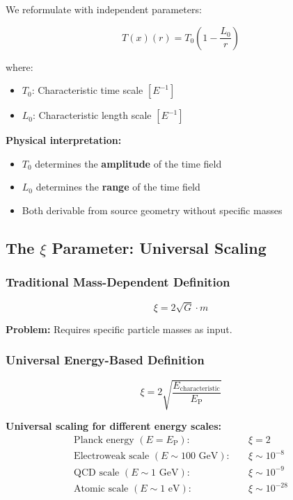 \documentclass[12pt,a4paper]{article}
\newcommand{\Tfield}{T(x)}
\newcommand{\Tzero}{T_0}
\newcommand{\EP}{E_{\text{P}}}
\newcommand{\xipar}{\xi}
\begin{document}
	We reformulate with independent parameters:
	
	\begin{equation}
		\boxed{\Tfield(r) = \Tzero\left(1 - \frac{L_0}{r}\right)}
		\label{eq:point_source_mass_free}
	\end{equation}
	
	where:
	\begin{itemize}
		\item $\Tzero$: Characteristic time scale $[E^{-1}]$
		\item $L_0$: Characteristic length scale $[E^{-1}]$
	\end{itemize}
	
	\textbf{Physical interpretation:}
	\begin{itemize}
		\item $\Tzero$ determines the \textbf{amplitude} of the time field
		\item $L_0$ determines the \textbf{range} of the time field
		\item Both derivable from source geometry without specific masses
	\end{itemize}
	
	\subsection{The $\xipar$ Parameter: Universal Scaling}
	\label{subsec:xi_elimination}
	
	\subsubsection{Traditional Mass-Dependent Definition}
	
	\begin{equation}
		\xipar = 2\sqrt{G} \cdot m
		\label{eq:xi_original}
	\end{equation}
	
	\textbf{Problem:} Requires specific particle masses as input.
	
	\subsubsection{Universal Energy-Based Definition}
	
	\begin{equation}
		\boxed{\xipar = 2\sqrt{\frac{E_{\text{characteristic}}}{\EP}}}
		\label{eq:xi_mass_free}
	\end{equation}
	
	\textbf{Universal scaling for different energy scales:}
	\begin{align}
		\text{Planck energy } (E = \EP): \quad &\xipar = 2 \\
		\text{Electroweak scale } (E \sim 100 \text{ GeV}): \quad &\xipar \sim 10^{-8} \\
		\text{QCD scale } (E \sim 1 \text{ GeV}): \quad &\xipar \sim 10^{-9} \\
		\text{Atomic scale } (E \sim 1 \text{ eV}): \quad &\xipar \sim 10^{-28}
	\end{align}
	
\end{document}
